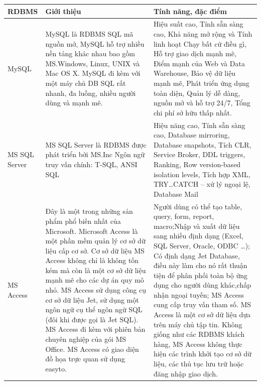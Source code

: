 \begin{table}[h]
\centering
\begin{tabular}{|l|l|l|} 
 \hline
 RDBMS & Giới thiệu & Tính năng, đặc điểm \\
 \hline
 \multicolumn{1}{|p{2cm}|}{MySQL} & \multicolumn{1}{p{7cm}|}{MySQL là RDBMS SQL mã nguồn mở, MySQL hỗ trợ nhiều nền tảng khác nhau bao gồm MS.Windows, Linux, UNIX và Mac OS X. MySQL đi kèm với một máy chủ DB SQL rất nhanh, đa luồng, nhiều người dùng và mạnh mẽ.} & \multicolumn{1}{p{6cm}|}{Hiệu suất cao, Tính sẵn sàng cao, Khả năng mở rộng và Tính linh hoạt Chạy bất cứ điều gì, Hỗ trợ giao dịch mạnh mẽ, Điểm mạnh của Web và Data Warehouse, Bảo vệ dữ liệu mạnh mẽ, Phát triển ứng dụng toàn diện, Quản lý dễ dàng, nguồn mở và hỗ trợ 24/7, Tổng chi phí sở hữu thấp nhất.}\\
 \hline
 \multicolumn{1}{|p{2cm}|}{MS SQL Server} & \multicolumn{1}{p{7cm}|}{MS SQL Server là RDBMS được phát triển bởi MS.Inc Ngôn ngữ truy vấn chính: T-SQL, ANSI SQL} & \multicolumn{1}{p{6cm}|}{Hiệu năng cao, Tính sẵn sàng cao, Database mirroring, Database snapshots, Tích CLR, Service Broker, DDL triggers, Ranking, Row version-based isolation levels, Tích hợp XML, TRY…CATCH – xử lý ngoại lệ, Database Mail}\\
 \hline
 \multicolumn{1}{|p{2cm}|}{MS Access} & \multicolumn{1}{p{7cm}|}{Đây là một trong những sản phẩm phổ biến nhất của Microsoft. Microsoft Access là một phần mềm quản lý cơ sở dữ liệu cấp cơ sở. Cơ sở dữ liệu MS Access không chỉ là không tốn kém mà còn là một cơ sở dữ liệu mạnh mẽ cho các dự án quy mô nhỏ. MS Access sử dụng công cụ cơ sở dữ liệu Jet, sử dụng một ngôn ngữ cụ thể ngôn ngữ SQL (đôi khi được gọi là Jet SQL). MS Access đi kèm với phiên bản chuyên nghiệp của gói MS Office. MS Access có giao diện đồ họa trực quan sử dụng easyto.} & \multicolumn{1}{p{6cm}|}{Người dùng có thể tạo table, query, form, report, macro;Nhập và xuất dữ liệu sang nhiều định dạng (Excel, SQL Server, Oracle, ODBC …); Có định dạng Jet Database, điều này làm cho nó rất thuận tiện để phân phối toàn bộ ứng dụng cho người dùng khác,chấp nhận ngoại tuyến; MS Access cung cấp truy vấn tham số. MS Access là một cơ sở dữ liệu dựa trên máy chủ tập tin. Không giống như các RDBMS khách hàng, MS Access không thực hiện các trình khởi tạo cơ sở dữ liệu, các thủ tục lưu trữ hoặc đăng nhập giao dịch.
}\\
\hline
\end{tabular}
\end{table}

